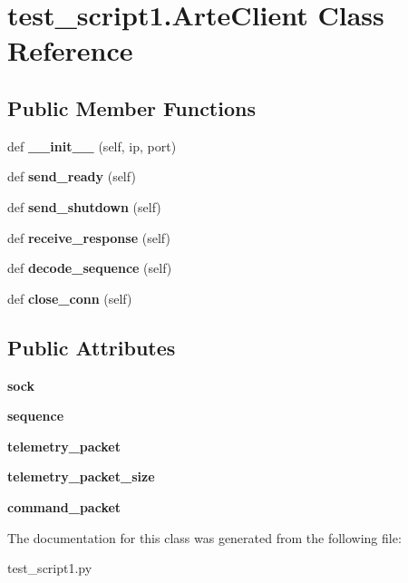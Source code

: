\section{test\+\_\+script1.\+Arte\+Client Class Reference}
\label{classtest__script1_1_1_arte_client}
\subsection*{Public Member Functions}
\begin{DoxyCompactItemize}
\item 
def {\bfseries \+\_\+\+\_\+init\+\_\+\+\_\+} (self, ip, port)\label{classtest__script1_1_1_arte_client_a6e05a3112a879b9a483598768dd6516f}

\item 
def {\bfseries send\+\_\+ready} (self)\label{classtest__script1_1_1_arte_client_a70f22d3ebfaefb7b34f2b14e7654ab27}

\item 
def {\bfseries send\+\_\+shutdown} (self)\label{classtest__script1_1_1_arte_client_abd36bbe05ad4f1205434aa33c72759a3}

\item 
def {\bfseries receive\+\_\+response} (self)\label{classtest__script1_1_1_arte_client_a3844e09eed8199db63c8a890375dafc6}

\item 
def {\bfseries decode\+\_\+sequence} (self)\label{classtest__script1_1_1_arte_client_ac180854792419d5f833bb9d204a61356}

\item 
def {\bfseries close\+\_\+conn} (self)\label{classtest__script1_1_1_arte_client_a59ef8b1548ccac6895bed4937bffbf1b}

\end{DoxyCompactItemize}
\subsection*{Public Attributes}
\begin{DoxyCompactItemize}
\item 
{\bfseries sock}\label{classtest__script1_1_1_arte_client_a7a696c46e3a31b495e6e5a956d145372}

\item 
{\bfseries sequence}\label{classtest__script1_1_1_arte_client_a4b0259b189312d45c76e26c856919fea}

\item 
{\bfseries telemetry\+\_\+packet}\label{classtest__script1_1_1_arte_client_a2c775f91c240200625b36b57ead85464}

\item 
{\bfseries telemetry\+\_\+packet\+\_\+size}\label{classtest__script1_1_1_arte_client_ad77794c171f0532b20d3c3b734233e72}

\item 
{\bfseries command\+\_\+packet}\label{classtest__script1_1_1_arte_client_a96cc7ecb9709017c4ea435d2d34ebf0c}

\end{DoxyCompactItemize}


The documentation for this class was generated from the following file\+:\begin{DoxyCompactItemize}
\item 
test\+\_\+script1.\+py\end{DoxyCompactItemize}
